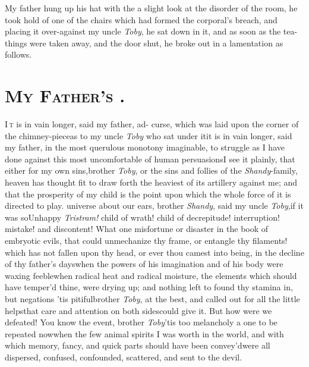 \documentclass{article}
\begin{document}
My father hung up his hat with the  a slight look at the disorder of the room, he took
hold of one of the chairs which had formed the corporal’s
breach, and placing it over-against my uncle \textit{Toby}, he sat
down in it, and as soon as the tea-things were taken away, and the
door shut, he broke out in a lamentation as follows.

\section{\textsc{My Father's }.}

\lettrine{I}{\,t} is in vain longer, said my father,
ad-\break\hbox{}
curse, which was laid upon the corner of the chimney-piece\tsk as
to my uncle \textit{Toby} who sat under it\tsk it is in vain
longer,
said my father, in the most querulous monotony imaginable,
to struggle as I have done against this most uncomfortable
of human persuasions\tsk I see it plainly, that either for
my own sins,\break brother \textit{Toby}, or the sins and follies
of the \textit{Shandy}-family, heaven has thought fit to
draw forth the heaviest of its artillery against me; and
that the prosperity of my child is the point upon which the
whole force of it is directed to play.\tsh\break
{} universe about our ears,
brother \textit{Shandy}, said my uncle \textit{Toby},\tsk if
it was so\tsk Unhappy \textit{Tristram!} child of wrath!
child of decrepitude!  interruption! mistake! and
discontent! What one misfortune or disaster in the book of
embryotic evils, that could unmechanize thy frame, or
entangle thy filaments!  which has not fallen upon thy head,
or ever thou camest
into being, in the decline of thy father’s days\tsk when the
powers of his imagination and of his body were waxing
feeble\tsk when radical heat and radical moisture, the
elements which should have temper’d thine, were drying up;
and nothing left to found thy stamina in, but
negations\tsk\break\enlargethispage\baselineskip
\tsk ’tis pitiful\tsk brother \textit{Toby}, at the best, and
called out for all the little helps\break that care and attention
on both sides\break could give it. But how were we defeated! You
know the event, brother \textit{Toby}\tsk ’tis too
melancholy a one to be repeated now\tsk when the few animal
spirits I was worth in the world, and with which memory,
fancy, and quick parts should have been convey’d\tsk were
all dispersed, confused, confounded, scattered, and sent to
the devil.\tsk{}
\end{document}
